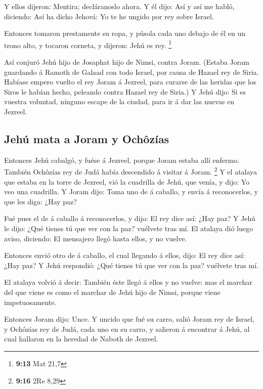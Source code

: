  Y ellos dijeron: Mentira; decláranoslo ahora. Y él dijo:
Así y así me habló, diciendo: Así ha dicho Jehová: Yo te he ungido por
rey sobre Israel.

 Entonces tomaron prestamente su ropa, y púsola cada uno
debajo de él en un trono alto, y tocaron corneta, y dijeron: Jehú es
rey. \footnote{\textbf{9:13} Mat 21,7}

 Así conjuró Jehú hijo de Josaphat hijo de Nimsi, contra
Joram. (Estaba Joram guardando á Ramoth de Galaad con todo Israel, por
causa de Hazael rey de Siria.  Habíase empero vuelto el
rey Joram á Jezreel, para curarse de las heridas que los Siros le habían
hecho, peleando contra Hazael rey de Siria.) Y Jehú dijo: Si es vuestra
voluntad, ninguno escape de la ciudad, para ir á dar las nuevas en
Jezreel.

\hypertarget{jehuxfa-mata-a-joram-y-ochuxf4zuxedas}{%
\subsection{Jehú mata a Joram y
Ochôzías}\label{jehuxfa-mata-a-joram-y-ochuxf4zuxedas}}

 Entonces Jehú cabalgó, y fuése á Jezreel, porque Joram
estaba allí enfermo. También Ochôzías rey de Judá había descendido á
visitar á Joram. \footnote{\textbf{9:16} 2Re 8,29}  Y el
atalaya que estaba en la torre de Jezreel, vió la cuadrilla de Jehú, que
venía, y dijo: Yo veo una cuadrilla. Y Joram dijo: Toma uno de á
caballo, y envía á reconocerlos, y que les diga: ¿Hay paz?

 Fué pues el de á caballo á reconocerlos, y dijo: El rey
dice así: ¿Hay paz? Y Jehú le dijo: ¿Qué tienes tú que ver con la paz?
vuélvete tras mí. El atalaya dió luego aviso, diciendo: El mensajero
llegó hasta ellos, y no vuelve.

 Entonces envió otro de á caballo, el cual llegando á
ellos, dijo: El rey dice así: ¿Hay paz? Y Jehú respondió: ¿Qué tienes tú
que ver con la paz? vuélvete tras mí.

 El atalaya volvió á decir: También éste llegó á ellos y
no vuelve: mas el marchar del que viene es como el marchar de Jehú hijo
de Nimsi, porque viene impetuosamente.

 Entonces Joram dijo: Unce. Y uncido que fué su carro,
salió Joram rey de Israel, y Ochôzías rey de Judá, cada uno en su carro,
y salieron á encontrar á Jehú, al cual hallaron en la heredad de Naboth
de Jezreel.

